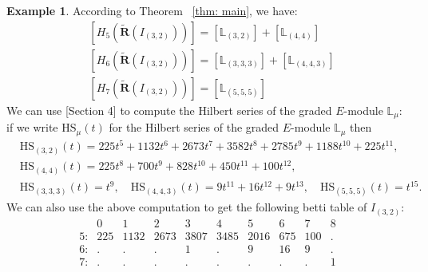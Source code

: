 \documentclass[12pt]{amsart}
\theoremstyle{definition}
\newtheorem{exmp}[thm]{Example}
\theoremstyle{remark}
\newcommand{\bbL}{\mathbb{L}}
\newcommand{\bR}{\mathbf{R}}
\numberwithin{equation}{section}
\begin{document}
\begin{exmp}
According to Theorem ~\ref{thm: main}, we have:
\begin{align*}
    & [H_5(\tilde{\bR}(I_{(3,2)}))] = [\bbL_{(3,2)}] + [\bbL_{(4,4)}] \\
    & [H_6(\tilde{\bR}(I_{(3,2)}))] = [\bbL_{(3,3,3)}] + [\bbL_{(4,4,3)}] \\
    & [H_7(\tilde{\bR}(I_{(3,2)}))] = [\bbL_{(5,5,5)}] 
\end{align*}
We can use \cite{SZ07}[Section 4] to compute the Hilbert series of the graded $E$-module $\bbL_{\mu}$: if we write $\mathrm{HS}_{\mu}(t)$ for the Hilbert series of the graded $E$-module $\bbL_{\mu}$ then 
\begin{align*}
    & \mathrm{HS}_{(3,2)}(t) = 225 t^5 + 1132 t^6 + 2673 t^7 + 3582 t^8 + 2785 t^9 + 1188 t^{10} + 225 t^{11},   \\
    & \mathrm{HS}_{(4,4)}(t) = 225 t^8 + 700 t^9 + 828 t^{10} + 450 t^{11} + 100 t^{12}, \\
    & \mathrm{HS}_{(3,3,3)}(t) = t^9, \quad \mathrm{HS}_{(4,4,3)}(t) = 9 t^{11} + 16 t^{12} + 9 t^{13}, \quad \mathrm{HS}_{(5,5,5)}(t) = t^{15}.
\end{align*}
We can also use the above computation to get the following betti table of $I_{(3,2)}$:
\begin{equation}\label{eq:betti-I32}
\begin{matrix}
     &0&1&2&3&4&5&6&7&8\\
     \text{5:}&225&
     1132&2673&3807&3485&2016&675&100&\text{.}\\\text{6:}&\text{.}&\text{.}&\text{.}&1&\text{.}&
     9&16&9&\text{.}\\\text{7:}&\text{.}&\text{.}&\text{.}&\text{.}&\text{.}&\text{.}&\text{.}&\text{.}&1\\
\end{matrix}
\end{equation}
\end{exmp}
\end{document}
